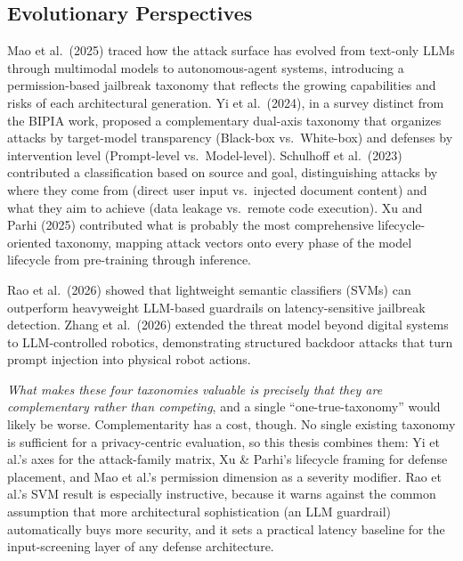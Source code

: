 \subsection{Evolutionary Perspectives}

Mao et al.\ (2025) traced how the attack surface has evolved from text-only LLMs through multimodal models to autonomous-agent systems, introducing a permission-based jailbreak taxonomy that reflects the growing capabilities and risks of each architectural generation. Yi et al.\ (2024), in a survey distinct from the BIPIA work, proposed a complementary dual-axis taxonomy that organizes attacks by target-model transparency (Black-box vs.\ White-box) and defenses by intervention level (Prompt-level vs.\ Model-level). Schulhoff et al.\ (2023) contributed a classification based on source and goal, distinguishing attacks by where they come from (direct user input vs.\ injected document content) and what they aim to achieve (data leakage vs.\ remote code execution). Xu and Parhi (2025) contributed what is probably the most comprehensive lifecycle-oriented taxonomy, mapping attack vectors onto every phase of the model lifecycle from pre-training through inference.

Rao et al.\ (2026) showed that lightweight semantic classifiers (SVMs) can outperform heavyweight LLM-based guardrails on latency-sensitive jailbreak detection. Zhang et al.\ (2026) extended the threat model beyond digital systems to LLM-controlled robotics, demonstrating structured backdoor attacks that turn prompt injection into physical robot actions.

\begin{critbox}
\textit{What makes these four taxonomies valuable is precisely that they are complementary rather than competing}, and a single ``one-true-taxonomy'' would likely be worse. Complementarity has a cost, though. No single existing taxonomy is sufficient for a privacy-centric evaluation, so this thesis combines them: Yi et al.'s axes for the attack-family matrix, Xu \& Parhi's lifecycle framing for defense placement, and Mao et al.'s permission dimension as a severity modifier. Rao et al.'s SVM result is especially instructive, because it warns against the common assumption that more architectural sophistication (an LLM guardrail) automatically buys more security, and it sets a practical latency baseline for the input-screening layer of any defense architecture.
\end{critbox}

